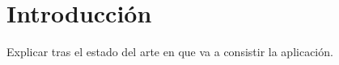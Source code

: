 \chapter{Introducción}

{\color{red} Explicar tras el estado del arte en que va a consistir la aplicación.}